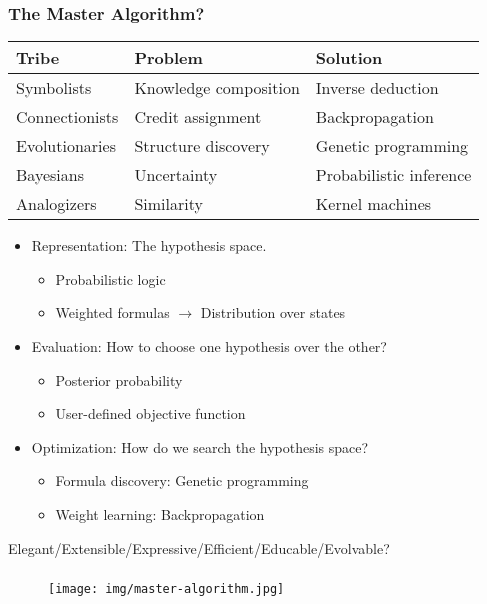 \documentclass[UTF8,11pt,colorlinks,compress,openany]{beamer}%
\begin{document}
\begin{frame}\frametitle{The Master Algorithm?}
\begin{table}
\abovetabulinesep=1mm
\belowtabulinesep=1mm
\begin{tabu}{l|l|l}
\hline
\textbf{Tribe} &\textbf{Problem} &\textbf{Solution}\\
\hline
Symbolists &Knowledge composition &Inverse deduction\\
\hline
Connectionists &Credit assignment &Backpropagation\\
\hline
Evolutionaries &Structure discovery &Genetic programming\\
\hline
Bayesians &Uncertainty &Probabilistic inference\\
\hline
Analogizers &Similarity &Kernel machines\\
\hline
\end{tabu}
\end{table}
\begin{itemize}
	\item Representation: The hypothesis space.
		\begin{itemize}
			\item Probabilistic logic
			\item Weighted formulas $\to$ Distribution over states
		\end{itemize}
	\item Evaluation: How to choose one hypothesis over the other?
		\begin{itemize}
			\item Posterior probability
			\item User-defined objective function
		\end{itemize}
	\item Optimization: How do we search the hypothesis space?
		\begin{itemize}
			\item Formula discovery: Genetic programming
			\item Weight learning: Backpropagation
		\end{itemize}
\end{itemize}
\begin{center}
Elegant/Extensible/Expressive/Efficient/Educable/Evolvable?
\end{center}
\end{frame}

\begin{frame}\frametitle{}
\vspace*{-1ex}
\begin{figure}[H]
\texttt{[image: img/master-algorithm.jpg]}
\end{figure}
\end{frame}
\end{document}
